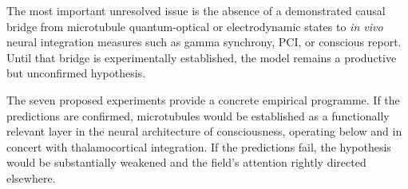 \documentclass[10pt, a4paper, twocolumn]{article}
\begin{document}
The most important unresolved issue is the absence of a demonstrated
causal bridge from microtubule quantum-optical or electrodynamic states
to \emph{in vivo} neural integration measures such as gamma synchrony,
PCI, or conscious report. Until that bridge is experimentally
established, the model remains a productive but unconfirmed hypothesis.

The seven proposed experiments provide a concrete empirical programme. If
the predictions are confirmed, microtubules would be established as a
functionally relevant layer in the neural architecture of consciousness,
operating below and in concert with thalamocortical integration. If the
predictions fail, the hypothesis would be substantially weakened and the
field's attention rightly directed elsewhere.



\raggedbottom


\end{document}
